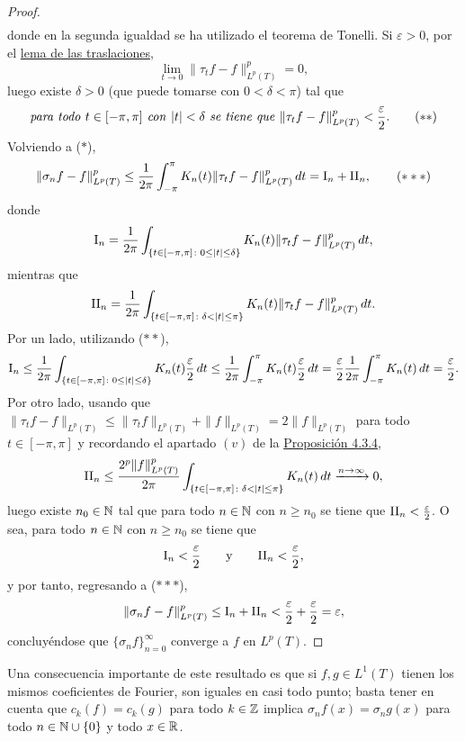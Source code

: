 \documentclass[a4paper, 11pt, oneside]{report}
\begin{document}
\begin{proof}
\begin{align*}
  \end{align*}
  donde en la segunda igualdad se ha utilizado el teorema de Tonelli. Si $\varepsilon > 0$, por el \hyperref[teo:4.0.4]{\color{c1}lema de las traslaciones}, 
  \[\lim_{t \to 0} \|\tau_tf - f\|_{L^p(T)}^p = 0,\]
  luego existe $\delta >0$ (que puede tomarse con $0 < \delta < \pi$) tal que 
  \[\textup{\emph{para todo }} t \in [-\pi,\pi] \textup{\emph{ con }} |t| < \delta \textup{\emph{ se tiene que }} \|\tau_tf-f\|_{L^p(T)}^p < \frac{\varepsilon}{2}. \tag{$\ast\ast$}\]
  Volviendo a ($\ast$),
  \[\|\sigma_nf-f\|_{L^p(T)}^p \leq \frac{1}{2\pi}\int_{-\pi}^\pi K_n(t) \|\tau_tf-f\|_{L^p(T)}^p \, dt = \textup{I}_n + \textup{II}_n, \tag{$\ast\ast\ast$}\]
  donde
  \[\textup{I}_n = \frac{1}{2\pi}\int_{\{t \in [-\pi,\pi] \colon 0 \leq |t| \leq \delta\}} K_n(t) \|\tau_tf-f\|_{L^p(T)}^p \, dt,\] mientras que \[\textup{II}_n = \frac{1}{2\pi}\int_{\{t \in [-\pi,\pi] \colon \delta < |t| \leq \pi\}} K_n(t) \|\tau_tf-f\|_{L^p(T)}^p \, dt. \]
  Por un lado, utilizando ($\ast\ast$),
  \[\textup{I}_n \leq \frac{1}{2\pi}\int_{\{t \in [-\pi,\pi] \colon 0 \leq |t| \leq \delta\}} K_n(t) \frac{\varepsilon}{2} \, dt  \leq \frac{1}{2\pi}\int_{-\pi}^\pi K_n(t) \frac{\varepsilon}{2} \, dt = \frac{\varepsilon}{2}\frac{1}{2\pi}\int_{-\pi}^\pi K_n(t) \, dt = \frac{\varepsilon}{2}.\]
  Por otro lado, usando que $\|\tau_tf-f\|_{L^p(T)} \leq \|\tau_tf\|_{L^p(T)}+\|f\|_{L^p(T)} = 2\|f\|_{L^p(T)}$ para todo $t \in [-\pi,\pi]$ y recordando el apartado $(v)$ de la \hyperref[pro:4.3.4]{\color{c1}Proposición 4.3.4},
  \[\textup{II}_n \leq  \frac{2^p \|f\|_{L^p(T)}^p}{2\pi}\int_{\{t \in [-\pi,\pi] \colon \delta < |t| \leq \pi\}} K_n(t) \, dt \xrightarrow{n \to \infty} 0,\]
  luego existe $n_0 \in \mathbb N$ tal que para todo $n \in \mathbb N$ con $n \geq n_0$ se tiene que $\textup{II}_n < \frac{\varepsilon}{2}$. O sea, para todo $n \in \mathbb N$ con $n \geq n_0$ se tiene que
  \[\textup{I}_n < \frac{\varepsilon}{2} \qquad \textup{y} \qquad \textup{II}_n < \frac{\varepsilon}{2},\]
  y por tanto, regresando a ($\ast\ast\ast$),
  \[\|\sigma_nf-f\|_{L^p(T)}^p \leq \textup{I}_n+\textup{II}_n < \frac{\varepsilon}{2}+\frac{\varepsilon}{2} = \varepsilon,\]
  concluyéndose que $\{\sigma_nf\}_{n=0}^\infty$ converge a $f$ en $L^p(T)$.
\end{proof}

Una consecuencia importante de este resultado es que si $f, g \in L^1(T)$ tienen los mismos coeficientes de Fourier, son iguales en casi todo punto; basta tener en cuenta que $c_k(f) = c_k(g)$ para todo $k \in \mathbb Z$ implica $\sigma_nf(x) = \sigma_ng(x)$ para todo $n \in \mathbb N \cup \{0\}$ y todo $x \in \mathbb R$.
\end{document}

